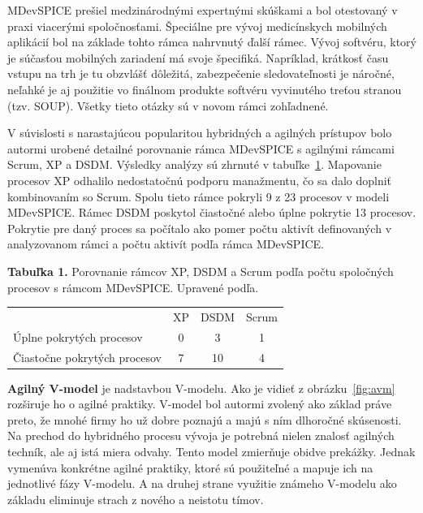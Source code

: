 \documentclass[10pt,twoside,slovak,a4paper]{article}
\begin{document}
MDevSPICE prešiel medzinárodnými expertnými skúškami a bol otestovaný v praxi viacerými spoločnosťami. Špeciálne pre vývoj medicínskych mobilných aplikácií bol na základe tohto rámca nahrvnutý ďalší rámec. Vývoj softvéru, ktorý je súčasťou mobilných zariadení má svoje špecifiká. Napríklad, krátkosť času vstupu na trh je tu obzvlášť dôležitá, zabezpečenie sledovateľnosti je náročné, neľahké je aj použitie vo finálnom produkte softvéru vyvinutého treťou stranou (tzv. SOUP). Všetky tieto otázky sú v novom rámci zohľadnené\cite{mobileMed}.

V súvislosti s narastajúcou popularitou hybridných a agilných prístupov bolo autormi urobené detailné porovnanie rámca MDevSPICE s agilnými rámcami Scrum, XP a DSDM. Výsledky analýzy sú zhrnuté v tabuľke~\ref{tabl}. Mapovanie procesov XP odhalilo nedostatočnú podporu manažmentu, čo sa dalo doplniť kombinovaním so Scrum. Spolu tieto rámce pokryli 9 z 23 procesov v modeli MDevSPICE. Rámec DSDM poskytol čiastočné alebo úplne pokrytie 13 procesov. Pokrytie pre daný proces sa počítalo ako pomer počtu aktivít definovaných v analyzovanom rámci a počtu aktivít podľa rámca MDevSPICE\cite{mccaffery2019}. 
\medskip

\noindent\textbf{Tabuľka 1.} Porovnanie rámcov XP, DSDM a Scrum podľa počtu spoločných procesov s rámcom MDevSPICE. Upravené podľa\cite{mccaffery2019}. 
\begin{table}[h!]
\label{tabl}
\centering
\begin{tabular}{l|c|c|c|}
 & XP & DSDM & Scrum \\
Úplne pokrytých procesov     & 0  & 3    & 1 \\
Čiastočne pokrytých procesov & 7  & 10   & 4 \\
\end{tabular}
\end{table}
\medskip

\textbf{Agilný V-model} je nadstavbou V-modelu. Ako je vidieť z obrázku~\ref{fig:avm} rozširuje ho o agilné praktiky. V-model bol autormi zvolený ako základ práve preto, že mnohé firmy ho už dobre poznajú a majú s ním dlhoročné skúsenosti. Na prechod do hybridného procesu vývoja je potrebná nielen znalosť agilných techník, ale aj istá miera odvahy. Tento model zmierňuje obidve prekážky. Jednak vymenúva konkrétne agilné praktiky, ktoré sú použiteľné a mapuje ich na jednotlivé fázy V-modelu. A na druhej strane využitie známeho V-modelu ako základu eliminuje strach z nového a neistotu tímov\cite{mchugh2013}.
\end{document}
